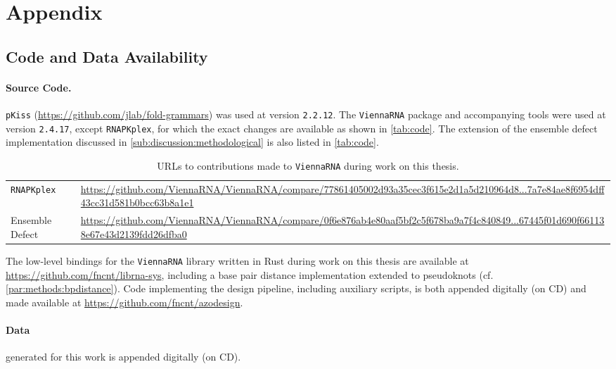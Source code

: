 \documentclass[../../master.tex]{subfiles}
\begin{document}
\section{Appendix}
\label{sec:appendix}

\subsection{Code and Data Availability}
\label{sub:appendix:code_availability}

\paragraph{Source Code.}

\texttt{pKiss} (\url{https://github.com/jlab/fold-grammars}) was used at version \texttt{2.2.12}.
The \texttt{ViennaRNA} package and accompanying tools were used at version \texttt{2.4.17}, except \texttt{RNAPKplex}, for which the exact changes are available as shown in \autoref{tab:code}.
The extension of the ensemble defect implementation discussed in \autoref{sub:discussion:methodological} is also listed in \autoref{tab:code}.

\begin{table}[!ht]
	\centering{}
	\caption[Code Contribution to \texttt{ViennaRNA}]{
		URLs to contributions made to \texttt{ViennaRNA} during work on this thesis.
	}
	\label{tab:code}
	\begin{tabularx}{\textwidth}{lX} \toprule
		\texttt{RNAPKplex} & \url{https://github.com/ViennaRNA/ViennaRNA/compare/77861405002d93a35cec3f615e2d1a5d210964d8...7a7e84ae8f6954dff43cc31d581b0bcc63b8a1e1} \\
		Ensemble Defect & \url{https://github.com/ViennaRNA/ViennaRNA/compare/0f6e876ab4e80aaf5bf2c5f678ba9a7f4c840849...67445f01d690f661138e67e43d2139fdd26dfba0} \\
		\bottomrule
	\end{tabularx}
\end{table}
The low-level bindings for the \texttt{ViennaRNA} library written in Rust during work on this thesis are available at \url{https://github.com/fncnt/librna-sys}, including a base pair distance implementation extended to pseudoknots (cf. \autoref{par:methods:bpdistance}).
Code implementing the design pipeline, including auxiliary scripts, is both appended digitally (on CD) and made available at \url{https://github.com/fncnt/azodesign}.
\vspace{-0.5cm}
\paragraph{Data}
generated for this work is appended digitally (on CD).
\vspace{-0.5cm}
\end{document}
